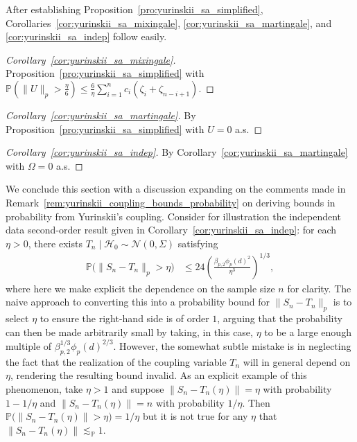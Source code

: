 \documentclass[11pt,lof]{puthesis}
\renewcommand{\P}{\ensuremath{\mathbb{P}}}
\newcommand{\cH}{\ensuremath{\mathcal{H}}}
\newcommand{\cN}{\ensuremath{\mathcal{N}}}
\theoremstyle{break}
\theoremstyle{proof}
\newtheorem{proof}{Proof}
\begin{document}
After establishing Proposition~\ref{pro:yurinskii_sa_simplified},
Corollaries~\ref{cor:yurinskii_sa_mixingale},
\ref{cor:yurinskii_sa_martingale},
and \ref{cor:yurinskii_sa_indep} follow easily.

\begin{proof}[Corollary~\ref{cor:yurinskii_sa_mixingale}]
Proposition~\ref{pro:yurinskii_sa_simplified} with
$\P ( \|U\|_p > \frac{\eta}{6} )
\leq \frac{6}{\eta} \sum_{i=1}^{n} c_i (\zeta_{i} + \zeta_{n-i+1})$.
\end{proof}

\begin{proof}[Corollary~\ref{cor:yurinskii_sa_martingale}]
By Proposition~\ref{pro:yurinskii_sa_simplified}
with $U=0$ a.s.
\end{proof}

\begin{proof}[Corollary~\ref{cor:yurinskii_sa_indep}]
By Corollary~\ref{cor:yurinskii_sa_martingale}
with $\Omega=0$ a.s.
\end{proof}

We conclude this section with a discussion expanding on the comments made
in Remark~\ref{rem:yurinskii_coupling_bounds_probability} on deriving bounds in
probability from Yurinskii's coupling. Consider for illustration the
independent data second-order result given in
Corollary~\ref{cor:yurinskii_sa_indep}: for each $\eta > 0$,
there exists $T_n \mid \cH_0 \sim \cN(0, \Sigma)$ satisfying
%
\begin{align*}
\P\big(\|S_n-T_n\|_p > \eta\big)
&\leq
24 \left(
\frac{\beta_{p,2} \phi_p(d)^2}{\eta^3}
\right)^{1/3},
\end{align*}
%
where here we make explicit the dependence on the sample size $n$ for clarity.
The naive approach to converting this into a probability bound for
$\|S_n-T_n\|_p$ is to select $\eta$ to ensure the right-hand side is
of order $1$, arguing that the probability can then be made arbitrarily
small by taking, in this case, $\eta$ to be a large enough multiple of
$\beta_{p,2}^{1/3} \phi_p(d)^{2/3}$. However, the somewhat subtle mistake is
in neglecting the fact that the realization of the coupling variable $T_n$
will in general depend on $\eta$, rendering the resulting
bound invalid.
As an explicit example of this phenomenon, take $\eta > 1$ and suppose
$\|S_n - T_n(\eta)\| = \eta$ with probability $1 - 1/\eta$ and
$\|S_n - T_n(\eta)\| = n$ with probability $1/\eta$.
Then $\P\big(\|S_n - T_n(\eta)\| > \eta\big) = 1/\eta$
but it is not true for any $\eta$ that $\|S_n - T_n(\eta)\| \lesssim_\P 1$.
\end{document}

